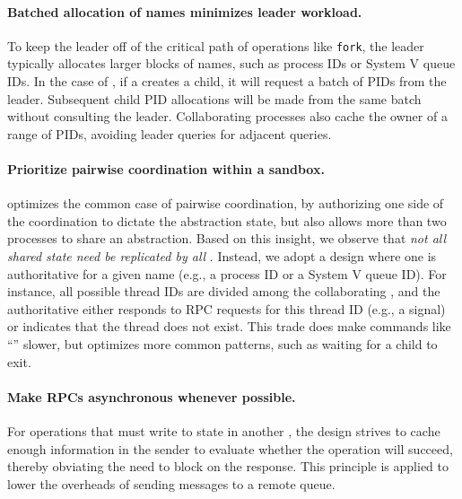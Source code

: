 \paragraph{Batched allocation of names minimizes leader workload.}
To keep the leader off of the critical path of operations like {\tt fork}, 
the leader typically allocates larger blocks of names, such as process IDs or System V queue IDs.
In the case of , if a \picoproc{} creates a child, it will request a batch of 
PIDs from the leader.  Subsequent child PID allocations will be made from the same 
batch without consulting the leader.
Collaborating processes also cache the owner of a range of PIDs, avoiding 
leader queries for adjacent queries.

\paragraph{Prioritize pairwise coordination within a sandbox.}
\graphene{} optimizes the common case of pairwise coordination,
by authorizing one side of the coordination to dictate the abstraction state,
but also allows
more than two processes to share an abstraction.
Based on this insight, 
we observe that {\em not all shared state need be replicated by all \picoprocs{}}.
Instead, we adopt a design where one \picoproc{} is authoritative for a given name (e.g., a process ID or a System V queue ID).
For instance, all possible thread IDs are divided among the collaborating \picoprocs{},
and the authoritative \picoproc{} either responds to RPC requests for this thread ID (e.g., a signal)
or indicates that the thread does not exist.
This trade does make commands like ``'' slower, 
but optimizes more common patterns, such as waiting for a child to exit.

\paragraph{Make RPCs asynchronous whenever possible.} 
For operations that must write to state in another \picoproc{}, 
the \graphene{} design strives to cache enough information in the sender 
to evaluate whether the operation will succeed, thereby obviating the 
need to block on the response.  This principle is applied to lower the overheads
of sending messages to a remote queue.





